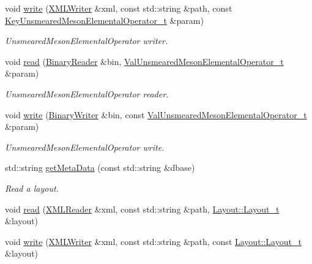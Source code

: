 \begin{DoxyCompactItemize}
void \mbox{\hyperlink{namespaceHadron_a12ff79f44bd22acfe6be486d4089262e}{write}} (\mbox{\hyperlink{classADATXML_1_1XMLWriter}{X\+M\+L\+Writer}} \&xml, const std\+::string \&path, const \mbox{\hyperlink{structHadron_1_1KeyUnsmearedMesonElementalOperator__t}{Key\+Unsmeared\+Meson\+Elemental\+Operator\+\_\+t}} \&param)
\begin{DoxyCompactList}\small\item\em Unsmeared\+Meson\+Elemental\+Operator writer. \end{DoxyCompactList}\item 
void \mbox{\hyperlink{namespaceHadron_a0dee7d09d7d8dd3947cd5a0c3c4c0447}{read}} (\mbox{\hyperlink{classADATIO_1_1BinaryReader}{Binary\+Reader}} \&bin, \mbox{\hyperlink{structHadron_1_1ValUnsmearedMesonElementalOperator__t}{Val\+Unsmeared\+Meson\+Elemental\+Operator\+\_\+t}} \&param)
\begin{DoxyCompactList}\small\item\em Unsmeared\+Meson\+Elemental\+Operator reader. \end{DoxyCompactList}\item 
void \mbox{\hyperlink{namespaceHadron_a78737ee2e9f7f708d926ec9f531c8f61}{write}} (\mbox{\hyperlink{classADATIO_1_1BinaryWriter}{Binary\+Writer}} \&bin, const \mbox{\hyperlink{structHadron_1_1ValUnsmearedMesonElementalOperator__t}{Val\+Unsmeared\+Meson\+Elemental\+Operator\+\_\+t}} \&param)
\begin{DoxyCompactList}\small\item\em Unsmeared\+Meson\+Elemental\+Operator write. \end{DoxyCompactList}\item 
std\+::string \mbox{\hyperlink{namespaceHadron_a6c9f3d44d269357faf4d786cc73ec742}{get\+Meta\+Data}} (const std\+::string \&dbase)
\begin{DoxyCompactList}\small\item\em Read a layout. \end{DoxyCompactList}\item 
void \mbox{\hyperlink{namespaceHadron_a2c6adb72eb12fa49cb7c0c7d15aa4aba}{read}} (\mbox{\hyperlink{classADATXML_1_1XMLReader}{X\+M\+L\+Reader}} \&xml, const std\+::string \&path, \mbox{\hyperlink{structHadron_1_1Layout_1_1Layout__t}{Layout\+::\+Layout\+\_\+t}} \&layout)
\item 
void \mbox{\hyperlink{namespaceHadron_ae327bbb04efa053f7be135b73bb596a7}{write}} (\mbox{\hyperlink{classADATXML_1_1XMLWriter}{X\+M\+L\+Writer}} \&xml, const std\+::string \&path, const \mbox{\hyperlink{structHadron_1_1Layout_1_1Layout__t}{Layout\+::\+Layout\+\_\+t}} \&layout)

\end{DoxyCompactItemize}
